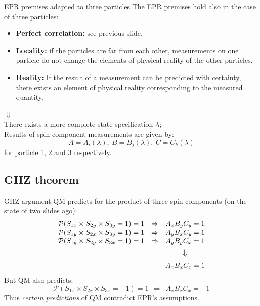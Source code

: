 \documentclass[10pt]{beamer}
\begin{document}
\begin{frame}{EPR premises adapted to three particles}
  The EPR premises hold also in the case of three particles:
  \begin{itemize}
  \item \textbf{Perfect correlation:} see previous slide.
  \item \textbf{Locality:} if the particles are far from each other, measurements on one particle do not change the elements of physical reality of the other particles.
  \item \textbf{Reality:} If the result of a measurement can be predicted with certainty, there exists an element of physical reality corresponding to the measured quantity.
  \end{itemize}
  \begin{center}
    {\Large $\Downarrow$}\\[0.2cm]
    There exists a more complete state specification $\lambda$;\\
    Results of spin component measurements are given by:
    \begin{equation*}
      A = A_i(\lambda),~ B = B_j(\lambda),~ C = C_k(\lambda)
    \end{equation*}
    for particle 1, 2 and 3 respectively.%
  \end{center}
\end{frame}




\subsection{GHZ theorem}
\begin{frame}{GHZ argument}
  QM predicts for the product of three spin components (on the state of two slides ago):
  \begin{equation*}
    \begin{matrix}
      \mathcal{P}(S_{1x} \times S_{2y} \times S_{3y} = 1) = 1 & \Rightarrow & A_x B_y C_y = 1\\
      \mathcal{P}(S_{1y} \times S_{2x} \times S_{3y} = 1) = 1 & \Rightarrow & A_y B_x C_y = 1\\
      \mathcal{P}(S_{1y} \times S_{2y} \times S_{3x} = 1) = 1 & \Rightarrow & A_y B_y C_x = 1\\[.2cm]
      & & \text{{\large $\Downarrow$}}\\[.2cm]
      & & A_x B_x C_x = 1
    \end{matrix}
  \end{equation*}
  But QM also predicts:
  \begin{equation*}
      \mathcal{P}(S_{1x} \times S_{2x} \times S_{3x} = - 1) = 1 ~~ \Rightarrow ~~ A_x B_x C_x = - 1
  \end{equation*}
  Thus \emph{certain predictions} of QM contradict EPR's assumptions.
\end{frame}
\end{document}
